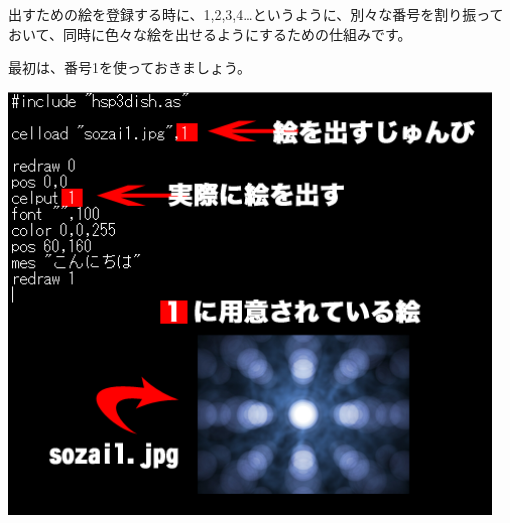 \documentclass[a4paper,dvipdfmx]{jarticle}
\begin{document}
出すための絵を登録する時に、1,2,3,4…というように、別々な番号を割り振っておいて、同時に色々な絵を出せるようにするための仕組みです。

最初は、番号1を使っておきましょう。


\bigskip



\begin{center}
\includegraphics[width=12.806cm,height=11.206cm]{text04-img/text04-img013.png}

\end{center}

\bigskip


\bigskip


\bigskip


\bigskip


\bigskip


\bigskip


\bigskip


\bigskip


\bigskip


\bigskip


\bigskip


\bigskip


\bigskip


\bigskip


\bigskip


\bigskip


\bigskip


\bigskip
\end{document}
